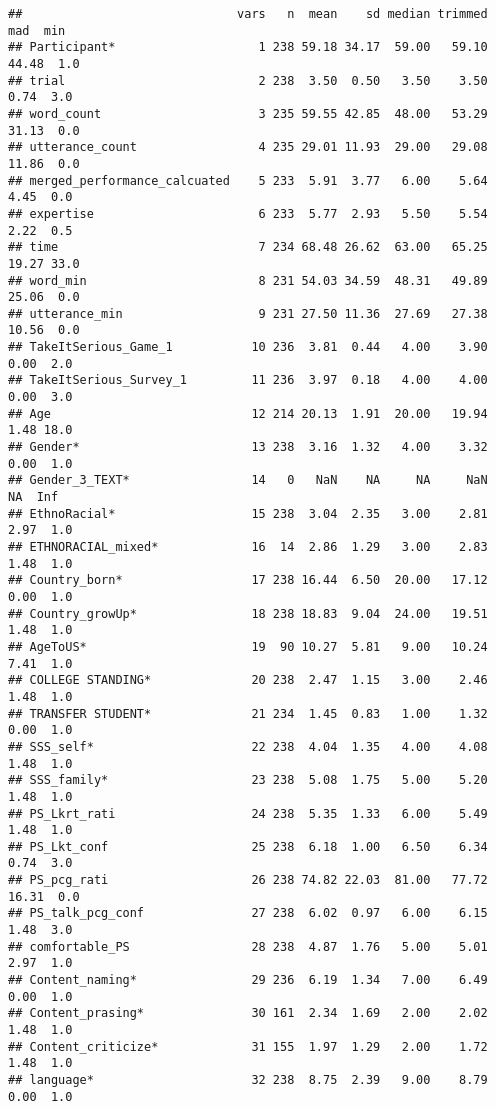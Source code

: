 \documentclass[
]{article}
\begin{document}
\begin{verbatim}
##                              vars   n  mean    sd median trimmed   mad  min
## Participant*                    1 238 59.18 34.17  59.00   59.10 44.48  1.0
## trial                           2 238  3.50  0.50   3.50    3.50  0.74  3.0
## word_count                      3 235 59.55 42.85  48.00   53.29 31.13  0.0
## utterance_count                 4 235 29.01 11.93  29.00   29.08 11.86  0.0
## merged_performance_calcuated    5 233  5.91  3.77   6.00    5.64  4.45  0.0
## expertise                       6 233  5.77  2.93   5.50    5.54  2.22  0.5
## time                            7 234 68.48 26.62  63.00   65.25 19.27 33.0
## word_min                        8 231 54.03 34.59  48.31   49.89 25.06  0.0
## utterance_min                   9 231 27.50 11.36  27.69   27.38 10.56  0.0
## TakeItSerious_Game_1           10 236  3.81  0.44   4.00    3.90  0.00  2.0
## TakeItSerious_Survey_1         11 236  3.97  0.18   4.00    4.00  0.00  3.0
## Age                            12 214 20.13  1.91  20.00   19.94  1.48 18.0
## Gender*                        13 238  3.16  1.32   4.00    3.32  0.00  1.0
## Gender_3_TEXT*                 14   0   NaN    NA     NA     NaN    NA  Inf
## EthnoRacial*                   15 238  3.04  2.35   3.00    2.81  2.97  1.0
## ETHNORACIAL_mixed*             16  14  2.86  1.29   3.00    2.83  1.48  1.0
## Country_born*                  17 238 16.44  6.50  20.00   17.12  0.00  1.0
## Country_growUp*                18 238 18.83  9.04  24.00   19.51  1.48  1.0
## AgeToUS*                       19  90 10.27  5.81   9.00   10.24  7.41  1.0
## COLLEGE STANDING*              20 238  2.47  1.15   3.00    2.46  1.48  1.0
## TRANSFER STUDENT*              21 234  1.45  0.83   1.00    1.32  0.00  1.0
## SSS_self*                      22 238  4.04  1.35   4.00    4.08  1.48  1.0
## SSS_family*                    23 238  5.08  1.75   5.00    5.20  1.48  1.0
## PS_Lkrt_rati                   24 238  5.35  1.33   6.00    5.49  1.48  1.0
## PS_Lkt_conf                    25 238  6.18  1.00   6.50    6.34  0.74  3.0
## PS_pcg_rati                    26 238 74.82 22.03  81.00   77.72 16.31  0.0
## PS_talk_pcg_conf               27 238  6.02  0.97   6.00    6.15  1.48  3.0
## comfortable_PS                 28 238  4.87  1.76   5.00    5.01  2.97  1.0
## Content_naming*                29 236  6.19  1.34   7.00    6.49  0.00  1.0
## Content_prasing*               30 161  2.34  1.69   2.00    2.02  1.48  1.0
## Content_criticize*             31 155  1.97  1.29   2.00    1.72  1.48  1.0
## language*                      32 238  8.75  2.39   9.00    8.79  0.00  1.0

\end{verbatim}
\end{document}
